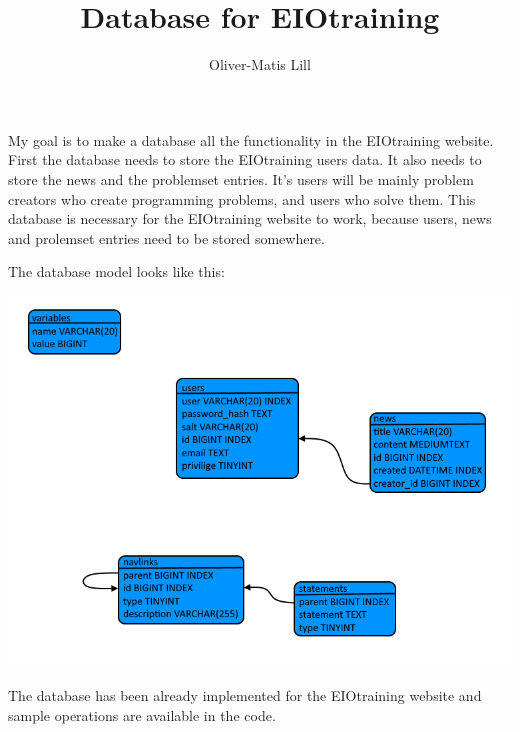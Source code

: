\documentclass{article}
\begin{document}
\title{Database for EIOtraining}
\author{Oliver-Matis Lill}
\maketitle


My goal is to make a database all the functionality in the EIOtraining website. First the database needs to store the EIOtraining users data. It also needs to store the news and the problemset entries. It's users will be mainly problem creators who create programming problems, and users who solve them. This database is necessary for the EIOtraining website to work, because users, news and prolemset entries need to be stored somewhere.

The database model looks like this:
\begin{center}
\includegraphics[scale=0.65]{database.png}
\end{center}

The database has been already implemented for the EIOtraining website and sample operations are available in the code.
\end{document}

